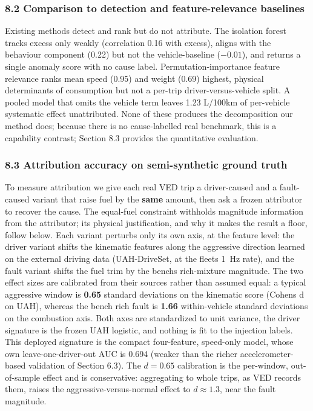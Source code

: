 \subsubsection{8.2 Comparison to detection and feature-relevance
baselines}\label{comparison-to-detection-and-feature-relevance-baselines}

Existing methods detect and rank but do not attribute. The isolation
forest tracks excess only weakly (correlation 0.16 with excess), aligns
with the behaviour component (0.22) but not the vehicle-baseline
(\(-0.01\)), and returns a single anomaly score with no cause label.
Permutation-importance feature relevance ranks mean speed (0.95) and
weight (0.69) highest, physical determinants of consumption but not a
per-trip driver-versus-vehicle split. A pooled model that omits the
vehicle term leaves 1.23 L/100km of per-vehicle systematic effect
unattributed. None of these produces the decomposition our method does;
because there is no cause-labelled real benchmark, this is a capability
contrast; Section 8.3 provides the quantitative evaluation.

\subsubsection{8.3 Attribution accuracy on semi-synthetic ground
truth}\label{attribution-accuracy-on-semi-synthetic-ground-truth}

To measure attribution we give each real VED trip a driver-caused and a
fault-caused variant that raise fuel by the \textbf{same} amount, then
ask a frozen attributor to recover the cause. The equal-fuel constraint
withholds magnitude information from the attributor; its physical
justification, and why it makes the result a floor, follow below. Each
variant perturbs only its own axis, at the feature level: the driver
variant shifts the kinematic features along the aggressive direction
learned on the external driving data (UAH-DriveSet, at the
fleet\textquotesingle s 1~Hz rate), and the fault variant shifts the
fuel trim by the bench\textquotesingle s rich-mixture magnitude. The two
effect sizes are calibrated from their sources rather than assumed
equal: a typical aggressive window is \textbf{0.65} standard deviations
on the kinematic score (Cohen\textquotesingle s d on UAH), whereas the
bench rich fault is \textbf{1.66} within-vehicle standard deviations on
the combustion axis. Both axes are standardized to unit variance, the
driver signature is the frozen UAH logistic, and nothing is fit to the
injection labels. This deployed signature is the compact four-feature,
speed-only model, whose own leave-one-driver-out AUC is 0.694 (weaker
than the richer accelerometer-based validation of Section 6.3). The
\(d = 0.65\) calibration is the per-window, out-of-sample effect and is
conservative: aggregating to whole trips, as VED records them, raises
the aggressive-versus-normal effect to \(d \approx 1.3\), near the fault
magnitude.

